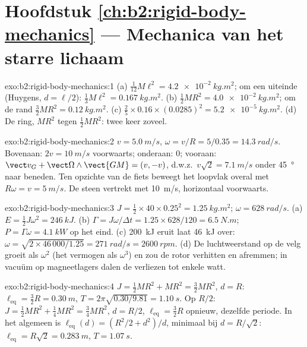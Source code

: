 \section*{Hoofdstuk \ref{ch:b2:rigid-body-mechanics} --- Mechanica van het
starre lichaam}

\begin{solution}{exo:b2:rigid-body-mechanics:1}
(a) $\tfrac1{12}M\ell^2 = \qty{4.2e-2}{kg.m^2}$; om een uiteinde (Huygens,
$d = \ell/2$): $\tfrac13M\ell^2 = \qty{0.167}{kg.m^2}$. (b)
$\tfrac12MR^2 =
\qty{4.0e-2}{kg.m^2}$; om de rand
$\tfrac32MR^2 = \qty{0.12}{kg.m^2}$. (c)
$\tfrac25 \times 0.16 \times (0.0285)^2 = \qty{5.2e-5}{kg.m^2}$. (d) De
ring, $MR^2$ tegen $\tfrac12MR^2$: twee keer zoveel.
\end{solution}

\begin{solution}{exo:b2:rigid-body-mechanics:2}
$v = \qty{5.0}{m/s}$, $\omega = v/R = 5/0.35 = \qty{14.3}{rad/s}$. Bovenaan:
$2v = \qty{10}{m/s}$ voorwaarts; onderaan: $0$; vooraan:
$\vect v_G + \vect\Omega
\wedge\vect{GM} = (v, -v)$, d.w.z.\
$v\sqrt2 = \qty{7.1}{m/s}$ onder \qty{45}{\degree} naar beneden. Ten
opzichte van de fiets beweegt het loopvlak overal met
$R\omega = v = \qty{5}{m/s}$. De steen vertrekt met \qty{10}{m/s},
horizontaal voorwaarts.
\end{solution}

\begin{solution}{exo:b2:rigid-body-mechanics:3}
$J = \tfrac12 \times 40 \times 0.25^2 = \qty{1.25}{kg.m^2}$;
$\omega = \qty{628}{rad/s}$. (a) $E = \tfrac12J\omega^2 = \qty{246}{kJ}$.
(b) $\Gamma = J\omega/\Delta t =
1.25 \times 628/120 = \qty{6.5}{N.m}$;
$P = \Gamma\omega = \qty{4.1}{kW}$ op het eind. (c) \qty{200}{kJ} eruit laat
\qty{46}{kJ} over:
$\omega = \sqrt{2 \times 46\,000/1.25}
= \qty{271}{rad/s} = \qty{2600}{rpm}$.
(d) De luchtweerstand op de velg groeit als $\omega^2$ (het vermogen als
$\omega^3$) en zou de rotor verhitten en afremmen; in vacuüm op
magneetlagers dalen de verliezen tot enkele watt.
\end{solution}

\begin{solution}{exo:b2:rigid-body-mechanics:4}
$J = \tfrac12MR^2 + MR^2 = \tfrac32MR^2$, $d = R$:
$\ell_{\text{eq}} = \tfrac32R
= \qty{0.30}{m}$,
$T = 2\pi\sqrt{0.30/9.81} = \qty{1.10}{s}$. Op $R/2$:
$J =
\tfrac12MR^2 + \tfrac14MR^2 = \tfrac34MR^2$, $d = R/2$,
$\ell_{\text{eq}} =
\tfrac32R$ opnieuw, dezelfde periode. In het algemeen is
$\ell_{\text{eq}}(d) = (R^2/2 +
d^2)/d$, minimaal bij $d = R/\sqrt2$:
$\ell_{\text{eq}} = R\sqrt2 = \qty{0.283}{m}$, $T = \qty{1.07}{s}$.
\end{solution}

